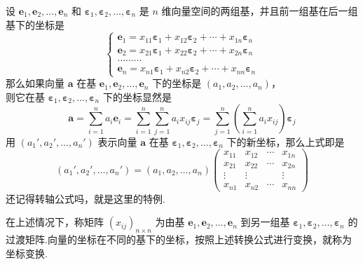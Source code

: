设 $\bm{e}_1, \bm{e}_2, \ldots, \bm{e}_n$ 和
$\bm{\varepsilon}_1, \bm{\varepsilon}_2, \ldots,
\bm{\varepsilon}_n$ 是 $n$
维向量空间的两组基，并且前一组基在后一组基下的坐标是
\[ \left\{ \begin{array}{l}
     \bm{e}_1 = x_{11} \bm{\varepsilon}_1 + x_{12}
     \bm{\varepsilon}_2 + \cdots + x_{1 n} \bm{\varepsilon}_n\\
     \bm{e}_2 = x_{21} \bm{\varepsilon}_1 + x_{22}
     \bm{\varepsilon}_2 + \cdots + x_{2 n} \bm{\varepsilon}_n\\
     \ldots \ldots \ldots\\
     \bm{e}_n = x_{n 1} \bm{\varepsilon}_1 + x_{n 2}
     \bm{\varepsilon}_2 + \cdots + x_{n n} \bm{\varepsilon}_n
   \end{array} \right. \]
那么如果向量 $\bm{a}$ 在基 $\bm{e}_1, \bm{e}_2,
\ldots, \bm{e}_n$ 下的坐标是 $(a_1, a_2, \ldots,
a_n)$，\\
则它在基 $\bm{\varepsilon}_1, \bm{\varepsilon}_2,
\ldots, \bm{\varepsilon}_n$ 下的坐标显然是
\[ \bm{a}= \sum_{i = 1}^n a_i \bm{e}_i = \sum_{i = 1}^n \sum_{j =
   1}^n a_i x_{i j} \bm{\varepsilon}_j = \sum_{j = 1}^n \left( \sum_{i =
   1}^n a_i x_{i j} \right) \bm{\varepsilon}_j \]
用 $(a_1', a_2', \ldots, a_n')$ 表示向量 $\bm{a}$ 在基
$\bm{\varepsilon}_1, \bm{\varepsilon}_2, \ldots,
\bm{\varepsilon}_n$ 下的新坐标，那么上式即是
\[ (a_1', a_2', \ldots, a_n') = (a_1, a_2, \ldots, a_n)
   \left(\begin{array}{cccc}
     x_{11} & x_{12} & \cdots & x_{1 n}\\
     x_{21} & x_{22} & \cdots & x_{2 n}\\
     \vdots & \vdots &  & \vdots\\
     x_{n 1} & x_{n 2} & \cdots & x_{n n}
   \end{array}\right) \]
还记得转轴公式吗，就是这里的特例.

\begin{definition}
  在上述情况下，称矩阵 $(x_{i j})_{n \times n}$ 为由基
  $\bm{e}_1, \bm{e}_2, \ldots, \bm{e}_n$ 到另一组基
  $\bm{\varepsilon}_1, \bm{\varepsilon}_2, \ldots,
  \bm{\varepsilon}_n$
  的过渡矩阵.向量的坐标在不同的基下的坐标，按照上述转换公式进行变换，就称为坐标变换.
\end{definition}



